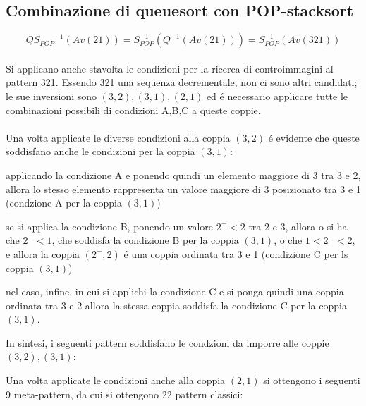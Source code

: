 \subsection*{Combinazione di {queuesort} con {POP-stacksort}}
$$Q{S_{POP}}^{-1}(Av(21)) = S_{POP}^{-1}(Q^{-1}(Av(21))) = S_{POP}^{-1}(Av(321))$$
\\Si applicano anche stavolta le condizioni per la ricerca di controimmagini al pattern 321. Essendo 321 una sequenza decrementale, non ci sono altri candidati; le sue inversioni sono $(3,2),(3,1),(2,1)$ ed \'e necessario applicare tutte le combinazioni possibili di condizioni A,B,C a queste coppie.\\\\
Una volta applicate le diverse condizioni alla coppia $(3,2)$ \'e evidente che queste soddisfano anche le condizioni per la coppia $(3,1)$:
\begin{description}
	\item applicando la condizione A e ponendo quindi un elemento maggiore di 3 tra 3 e 2, allora lo stesso elemento rappresenta un valore maggiore di 3 posizionato tra 3 e 1 (condzione A per la coppia $(3,1)$)
	\item se si applica la condizione B, ponendo un valore $2^-<2$ tra 2 e 3, allora o si ha che $2^-<1$, che soddisfa la condizione B per la coppia $(3,1)$, o che $1<2^-<2$, e allora la coppia $(2^-,2)$ \'e una coppia ordinata tra 3 e 1 (condizione C per ls coppia $(3,1)$)
	\item nel caso, infine, in cui si applichi la condizione C e si ponga quindi una coppia ordinata tra 3 e 2 allora la stessa coppia soddisfa la condizione C per la coppia $(3,1)$.
\end{description}
In sintesi, i seguenti pattern soddisfano le condzioni da imporre alle coppie $(3,2),(3,1)$:
\begin{center}
\end{center}
Una volta applicate le condizioni anche alla coppia $(2,1)$ si ottengono i seguenti 9 meta-pattern, da cui si ottengono 22 pattern classici:
\begin{center}
\end{center}
